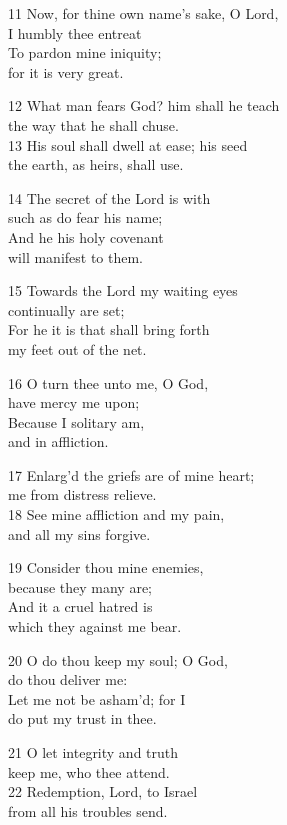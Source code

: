 11 Now, for thine own name’s sake, O Lord,\\
I humbly thee entreat\\
To pardon mine iniquity;\\
for it is very great.

12 What man fears God? him shall he teach\\
the way that he shall chuse.\\
13 His soul shall dwell at ease; his seed\\
the earth, as heirs, shall use.

14 The secret of the Lord is with\\
such as do fear his name;\\
And he his holy covenant\\
will manifest to them.

15 Towards the Lord my waiting eyes\\
continually are set;\\
For he it is that shall bring forth\\
my feet out of the net.

16 O turn thee unto me, O God,\\
have mercy me upon;\\
Because I solitary am,\\
and in affliction.

17 Enlarg’d the griefs are of mine heart;\\
me from distress relieve.\\
18 See mine affliction and my pain,\\
and all my sins forgive.

19 Consider thou mine enemies,\\
because they many are;\\
And it a cruel hatred is\\
which they against me bear.

20 O do thou keep my soul; O God,\\
do thou deliver me:\\
Let me not be asham’d; for I\\
do put my trust in thee.

21 O let integrity and truth\\
keep me, who thee attend.\\
22 Redemption, Lord, to Israel\\
from all his troubles send.

\begin{center}
\quad{}\quad{}
\end{center}

